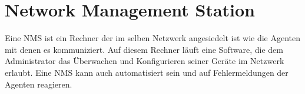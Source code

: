 \documentclass[11pt,a4paper]{article}
\begin{document}
\section*{Network Management Station}
Eine NMS ist ein Rechner der im selben Netzwerk angesiedelt ist wie die Agenten mit denen es kommuniziert. Auf diesem Rechner läuft eine Software, die dem Administrator das Überwachen und Konfigurieren seiner Geräte im Netzwerk erlaubt. Eine NMS kann auch automatisiert sein und auf Fehlermeldungen der Agenten reagieren.
\linebreak

\end{document}
